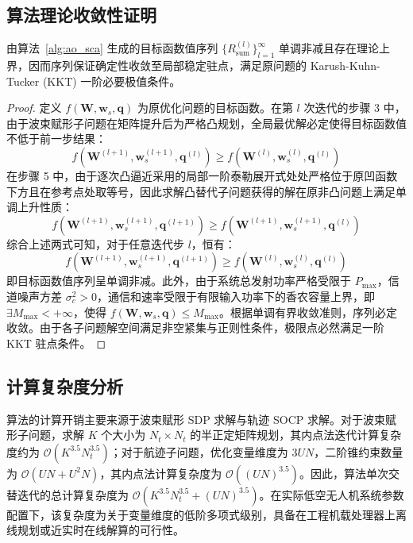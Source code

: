 \subsection{算法理论收敛性证明}
\begin{theorem}
  由算法~\ref{alg:ao_sca} 生成的目标函数值序列 $\{R_{\mathrm{sum}}^{(l)}\}_{l=1}^\infty$ 单调非减且存在理论上界，因而序列保证确定性收敛至局部稳定驻点，满足原问题的 Karush-Kuhn-Tucker (KKT) 一阶必要极值条件。
\end{theorem}

\begin{proof}
  定义 $f(\mathbf{W}, \mathbf{w}_s, \mathbf{q})$ 为原优化问题的目标函数。在第 $l$ 次迭代的步骤 3 中，由于波束赋形子问题在矩阵提升后为严格凸规划，全局最优解必定使得目标函数值不低于前一步结果：
  \begin{equation}
    f(\mathbf{W}^{(l+1)}, \mathbf{w}_s^{(l+1)}, \mathbf{q}^{(l)}) \ge f(\mathbf{W}^{(l)}, \mathbf{w}_s^{(l)}, \mathbf{q}^{(l)})
  \end{equation}
  在步骤 5 中，由于逐次凸逼近采用的局部一阶泰勒展开式处处严格位于原凹函数下方且在参考点处取等号，因此求解凸替代子问题获得的解在原非凸问题上满足单调上升性质：
  \begin{equation}
    f(\mathbf{W}^{(l+1)}, \mathbf{w}_s^{(l+1)}, \mathbf{q}^{(l+1)}) \ge f(\mathbf{W}^{(l+1)}, \mathbf{w}_s^{(l+1)}, \mathbf{q}^{(l)})
  \end{equation}
  综合上述两式可知，对于任意迭代步 $l$，恒有：
  \begin{equation}
    f(\mathbf{W}^{(l+1)}, \mathbf{w}_s^{(l+1)}, \mathbf{q}^{(l+1)}) \ge f(\mathbf{W}^{(l)}, \mathbf{w}_s^{(l)}, \mathbf{q}^{(l)})
  \end{equation}
  即目标函数值序列呈单调非减。此外，由于系统总发射功率严格受限于 $P_{\max}$，信道噪声方差 $\sigma_c^2 > 0$，通信和速率受限于有限输入功率下的香农容量上界，即 $\exists M_{\max} < +\infty$，使得 $f(\mathbf{W}, \mathbf{w}_s, \mathbf{q}) \le M_{\max}$。根据单调有界收敛准则，序列必定收敛。由于各子问题解空间满足非空紧集与正则性条件，极限点必然满足一阶 KKT 驻点条件。
\end{proof}

\subsection{计算复杂度分析}
算法的计算开销主要来源于波束赋形 SDP 求解与轨迹 SOCP 求解。对于波束赋形子问题，求解 $K$ 个大小为 $N_t \times N_t$ 的半正定矩阵规划，其内点法迭代计算复杂度约为 $\mathcal{O}(K^{3.5} N_t^{3.5})$；对于航迹子问题，优化变量维度为 $3UN$，二阶锥约束数量为 $\mathcal{O}(UN + U^2 N)$，其内点法计算复杂度为 $\mathcal{O}((UN)^{3.5})$。因此，算法单次交替迭代的总计算复杂度为 $\mathcal{O}\left(K^{3.5} N_t^{3.5} + (UN)^{3.5}\right)$。在实际低空无人机系统参数配置下，该复杂度为关于变量维度的低阶多项式级别，具备在工程机载处理器上离线规划或近实时在线解算的可行性。
